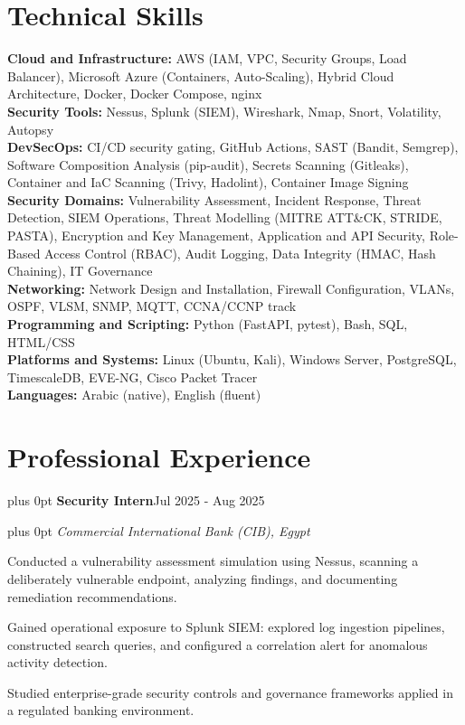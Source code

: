 \documentclass[10pt,letterpaper]{article}
\newcommand{\headerrow}[2]{%
  \begingroup\rightskip=0pt plus 0pt\relax
  #1\hfill #2\par\endgroup}
\newcommand{\entry}[4]{%
  \headerrow{\textbf{#1}}{#2}%
  \headerrow{\textit{#3}}{\textit{#4}}%
  \vspace{0.1em}}
\newenvironment{block}{\vspace{0.05em}\begingroup}{\endgroup\vspace{0.2em}}
\begin{document}
\section*{Technical Skills}
\begin{block}
\textbf{Cloud and Infrastructure:} AWS (IAM, VPC, Security Groups, Load Balancer), Microsoft Azure (Containers, Auto-Scaling), Hybrid Cloud Architecture, Docker, Docker Compose, nginx\\[0.1em]
\textbf{Security Tools:} Nessus, Splunk (SIEM), Wireshark, Nmap, Snort, Volatility, Autopsy\\[0.1em]
\textbf{DevSecOps:} CI/CD security gating, GitHub Actions, SAST (Bandit, Semgrep), Software Composition Analysis (pip-audit), Secrets Scanning (Gitleaks), Container and IaC Scanning (Trivy, Hadolint), Container Image Signing\\[0.1em]
\textbf{Security Domains:} Vulnerability Assessment, Incident Response, Threat Detection, SIEM Operations, Threat Modelling (MITRE ATT\&CK, STRIDE, PASTA), Encryption and Key Management, Application and API Security, Role-Based Access Control (RBAC), Audit Logging, Data Integrity (HMAC, Hash Chaining), IT Governance\\[0.1em]
\textbf{Networking:} Network Design and Installation, Firewall Configuration, VLANs, OSPF, VLSM, SNMP, MQTT, CCNA/CCNP track\\[0.1em]
\textbf{Programming and Scripting:} Python (FastAPI, pytest), Bash, SQL, HTML/CSS\\[0.1em]
\textbf{Platforms and Systems:} Linux (Ubuntu, Kali), Windows Server, PostgreSQL, TimescaleDB, EVE-NG, Cisco Packet Tracer\\[0.1em]
\textbf{Languages:} Arabic (native), English (fluent)
\end{block}

\section*{Professional Experience}

\entry{Security Intern}{Jul 2025 - Aug 2025}
      {Commercial International Bank (CIB), Egypt}{}
\begin{tight}
  \item Conducted a vulnerability assessment simulation using Nessus, scanning a deliberately vulnerable endpoint, analyzing findings, and documenting remediation recommendations.
  \item Gained operational exposure to Splunk SIEM: explored log ingestion pipelines, constructed search queries, and configured a correlation alert for anomalous activity detection.
  \item Studied enterprise-grade security controls and governance frameworks applied in a regulated banking environment.
\end{tight}
\vspace{0.22em}
\end{document}
